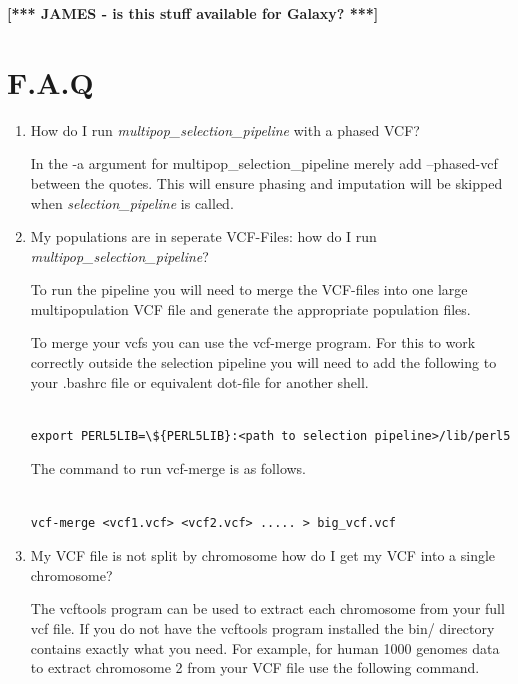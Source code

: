 \documentclass[a4paper,10pt]{article}
\begin{document}
\noindent
{\bf\small\color{blue} [*** JAMES - is this stuff available for
  Galaxy? ***]}

\section{F.A.Q}
\begin{enumerate}
\item How do I run \emph{multipop\_selection_pipeline} with a phased VCF?

In the -a argument for multipop\_selection_pipeline merely add --phased-vcf
between the quotes. This will ensure phasing and imputation will be
skipped when \emph{selection\_pipeline} is called.


\item My populations are in seperate VCF-Files: how do I run \emph{multipop\_selection_pipeline}?

To run the pipeline you will need to merge the VCF-files into one
large multipopulation VCF file and generate the appropriate population
files. 

To merge your vcfs you can use the vcf-merge program. For this to work
correctly outside the selection pipeline you will need to add the
following to your .bashrc file or equivalent dot-file for another
shell.\\

\begin{verbatim}

export PERL5LIB=\${PERL5LIB}:<path to selection pipeline>/lib/perl5

\end{verbatim}

The command to run vcf-merge is as follows.

\begin{verbatim}

vcf-merge <vcf1.vcf> <vcf2.vcf> ..... > big_vcf.vcf

\end{verbatim}

\item My VCF file is not split by chromosome how do I get my VCF into a single chromosome?

The vcftools program can be used to extract each chromosome from your
full vcf file. If you do not have the vcftools program installed the
bin/ directory  contains exactly what you need. For example, for human
1000 genomes data to extract chromosome 2 from your VCF file use the
following command. 


\end{enumerate}
\end{document}
